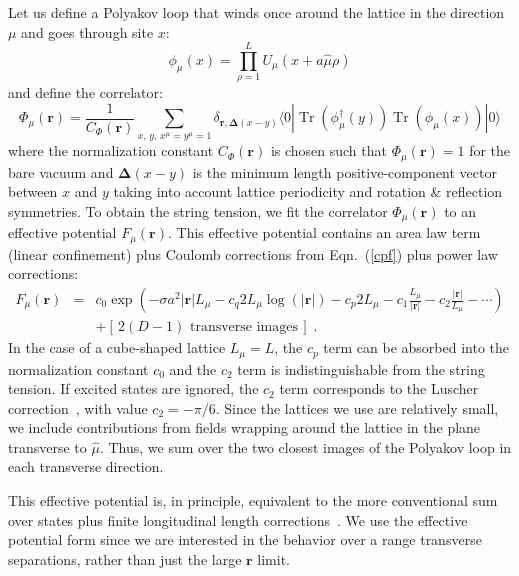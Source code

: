 \documentclass[preprint,aps,prd]{revtex4-2}
\newcommand{\be}{\begin{equation}}
\newcommand{\eq}{\end{equation}}
\DeclareMathOperator{\Tr}{Tr}
\begin{document}
Let us define a Polyakov loop that winds once around the lattice
in the direction $\mu$ and goes through site $x$:
\be
         \phi_\mu(x)= \prod_{\rho=1}^L U_\mu(x+a \hat{\mu} \rho)
\eq
and define the correlator:
\be
\Phi_\mu(\mathbf{r}) = \frac{1}{C_\Phi(\mathbf{r})} \sum_{x, \,y,\, x^\mu = y^\mu =1}
           \delta_{\mathbf{r},\mathbf{\Delta}(x-y)}
           \langle 0 | \Tr\left(\phi_\mu^\dagger(y)\right)
            \Tr\left(\phi_\mu(x)\right) |0\rangle
           \label{pcorr}
\eq
%
where the normalization constant $C_\Phi(\mathbf{r})$ is chosen such that
$\Phi_\mu(\mathbf{r})=1$ for the bare vacuum and
$\mathbf{\Delta}(x-y)$ is the minimum length positive-component
vector between $x$ and $y$ taking into account lattice periodicity
and rotation \& reflection symmetries.
To obtain the string tension,
we fit the correlator $\Phi_\mu(\mathbf{r})$ to an effective
potential $F_\mu(\mathbf{r})$.
This effective potential contains an area law term (linear confinement)
plus Coulomb corrections from Eqn.~(\ref{cpf}) plus power law corrections:
%
\begin{eqnarray}
         F_\mu(\mathbf{r}) &=& c_0 \exp\left(
         -\sigma a^2 \left|\mathbf{r}\right| L_\mu
         - c_q 2 L_\mu \log(\left|\mathbf{r}\right|) - c_p 2 L_\mu
         - c_1 \frac{L_\mu}{\left|\mathbf{r}\right|}
         - c_2 \frac{\left|\mathbf{r}\right|}{L_\mu} - \cdots \right)\nonumber\\
         & & + \left[\,\mbox{$2 (D-1)$ transverse images}\,\right]
         \; .  \label{stringmodel}
\end{eqnarray}
%
In the case of
a cube-shaped lattice $L_\mu = L$, the $c_p$ term can be absorbed into
the normalization constant $c_0$ and the $c_2$ term is indistinguishable from
the string tension.  If excited states are ignored, the $c_2$ term corresponds
to the Luscher correction~\cite{luscher_anomalies_1980}, with value
$c_2 = -\pi/6$.
Since the lattices we use are relatively small, we include contributions
from fields wrapping around the lattice in the plane transverse to
$\hat{\mu}$.  Thus, we sum over the two closest images of the Polyakov
loop in each transverse direction.

This effective potential is, in principle, equivalent to the more
conventional sum over states plus finite longitudinal length
corrections~\cite{teper_large_2009,aharony_effective_2013}.
We use the effective potential form since we are interested in
the behavior over a range transverse separations, rather than
just the large $\mathbf{r}$ limit.
\end{document}
